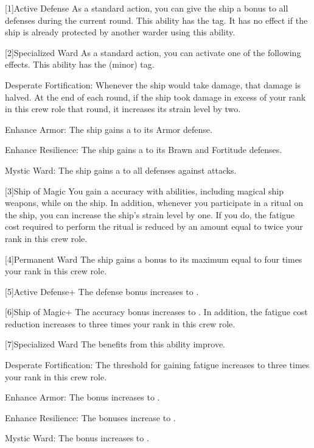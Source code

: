     [1]{Active Defense} As a standard action, you can give the ship a  bonus to all defenses during the current round.
      This ability has the  tag.
      It has no effect if the ship is already protected by another warder using this ability.

    [2]{Specialized Ward} As a standard action, you can activate one of the following effects.
      This ability has the  (minor) tag.
      \begin{raggeditemize}
        \item Desperate Fortification: Whenever the ship would take damage, that damage is halved.
          At the end of each round, if the ship took damage in excess of your rank in this crew role that round, it increases its strain level by two.
        \item Enhance Armor: The ship gains a   to its Armor defense.
        \item Enhance Resilience: The ship gains a   to its Brawn and Fortitude defenses.
        \item Mystic Ward: The ship gains a   to all defenses against \magical attacks.
      \end{raggeditemize}

    [3]{Ship of Magic} You gain a  accuracy with \magical abilities, including magical ship weapons, while on the ship.
      In addition, whenever you participate in a ritual on the ship, you can increase the ship's strain level by one.
      If you do, the fatigue cost required to perform the ritual is reduced by an amount equal to twice your rank in this crew role.

    [4]{Permanent Ward} The ship gains a bonus to its maximum  equal to four times your rank in this crew role.

    [5]{Active Defense+} The defense bonus increases to .

    [6]{Ship of Magic+} The accuracy bonus increases to .
      In addition, the fatigue cost reduction increases to three times your rank in this crew role.

    [7]{Specialized Ward} The benefits from this ability improve.
      \begin{raggeditemize}
        \item Desperate Fortification: The threshold for gaining fatigue increases to three times your rank in this crew role.
        \item Enhance Armor: The bonus increases to .
        \item Enhance Resilience: The bonuses increase to .
        \item Mystic Ward: The bonus increases to .
      \end{raggeditemize}
